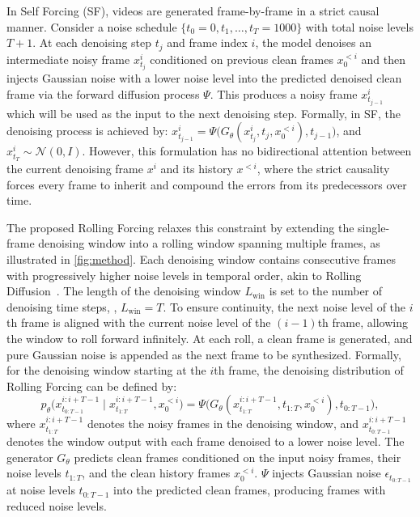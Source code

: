 In Self Forcing (SF), videos are generated frame-by-frame in a strict causal manner. Consider a noise schedule $\{t_0=0,t_1, \dots, t_{T}=1000\}$ with total noise levels $T+1$. At each denoising step $t_j$ and frame index $i$, the model denoises an intermediate noisy frame \( x^i_{t_j} \) conditioned on previous clean frames \( x^{<i}_0 \) and then injects Gaussian noise with a lower noise level into the predicted denoised clean frame via the forward diffusion process $\Psi$. This produces a noisy frame \( x^i_{t_{j - 1}} \) which will be used as the input to the next denoising step. Formally, in SF, the denoising process is achieved by: $ x^i_{t_{j - 1}} = \Psi\big(G_\theta(x^i_{t_j}, t_{j},  x^{<i}_0), t_{j-1}\big)$, \mbox{and $ x^i_{t_{T}} \sim \mathcal{N}(0, I)$}. However, this formulation has no bidirectional attention between the current denoising frame $x^i$ and its history $x^{<i}$, where the strict causality forces every frame to inherit and compound the errors from its predecessors over time.



The proposed Rolling Forcing relaxes this constraint by extending the single-frame denoising window into a rolling window spanning multiple frames, as illustrated in \cref{fig:method}. Each denoising window contains consecutive frames with progressively higher noise levels in temporal order, akin to Rolling Diffusion~\citep{ruhe2024rolling}. The length of the denoising window $L_{\mathrm{win}}$ is set to the number of denoising time steps, \ie, $L_{\mathrm{win}} = T$. To ensure continuity, the next noise level of the $i$th frame is aligned with the current noise level of the $(i-1)$th frame, allowing the window to roll forward infinitely. At each roll, a clean frame is generated, and pure Gaussian noise is appended as the next frame to be synthesized. Formally, for the denoising window starting at the $i$th frame, the denoising distribution of Rolling Forcing can be defined by:
\begin{equation}
\label{eq:roll_window}
    p_\theta
    \Big(x^{i:i+T-1}_{t_{0:T-1}} \mid x^{i:i+T-1}_{t_{1:T}}, x^{<i}_0\Big) 
    = 
    \Psi\Big( G_\theta ( x^{i:i+T-1}_{t_{1:T}}, t_{1:T},  x^{<i}_0 ), t_{0:T-1}\Big),
\end{equation}
where $x^{i:i+T-1}_{t_{1:T}}$ denotes the noisy frames in the denoising window, and $x^{i:i+T-1}_{t_{0:T-1}}$ denotes the window output with each frame denoised to a lower noise level. The generator $G_\theta$ predicts clean frames conditioned on the input noisy frames, their noise levels $t_{1:T}$, and the clean history frames $x_0^{<i}$. $\Psi$ injects Gaussian noise $\epsilon_{t_{0:T-1}}$ at noise levels $t_{0:T-1}$ into the predicted clean frames, producing frames with reduced noise levels.

